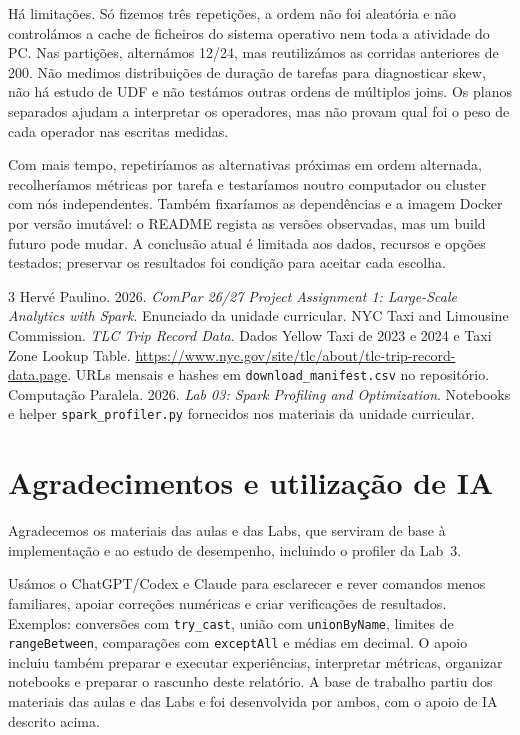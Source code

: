 \documentclass[sigconf]{acmart}
\begin{document}
Há limitações. Só fizemos três repetições, a ordem não foi
aleatória e não controlámos a cache de ficheiros do sistema
operativo nem toda a atividade do PC. Nas partições, alternámos
12/24, mas reutilizámos as corridas anteriores de 200. Não medimos
distribuições de duração de tarefas para diagnosticar skew, não
há estudo de UDF e não testámos outras ordens de múltiplos joins.
Os planos separados ajudam a interpretar os operadores, mas não
provam qual foi o peso de cada operador nas escritas medidas.

Com mais tempo, repetiríamos as alternativas próximas em ordem
alternada, recolheríamos métricas por tarefa e testaríamos noutro
computador ou cluster com nós independentes. Também fixaríamos as
dependências e a imagem Docker por versão imutável: o README
regista as versões observadas, mas um build futuro pode mudar.
A conclusão atual é limitada aos dados, recursos e opções testados;
preservar os resultados foi condição para aceitar cada escolha.

\clearpage
\begin{thebibliography}{3}
Hervé Paulino. 2026. \textit{ComPar 26/27 Project Assignment 1:
Large-Scale Analytics with Spark}. Enunciado da unidade curricular.
NYC Taxi and Limousine Commission. \textit{TLC Trip Record Data}.
Dados Yellow Taxi de 2023 e 2024 e Taxi Zone Lookup Table.
\url{https://www.nyc.gov/site/tlc/about/tlc-trip-record-data.page}.
URLs mensais e hashes em \texttt{download\_manifest.csv} no repositório.
Computação Paralela. 2026. \textit{Lab 03: Spark Profiling and
Optimization}. Notebooks e helper \texttt{spark\_profiler.py}
fornecidos nos materiais da unidade curricular.
\end{thebibliography}

\section*{Agradecimentos e utilização de IA}
Agradecemos os materiais das aulas e das Labs, que serviram de base
à implementação e ao estudo de desempenho, incluindo o profiler da Lab~3.

Usámos o ChatGPT/Codex e Claude para esclarecer e rever comandos menos
familiares, apoiar correções numéricas e criar verificações de
resultados. Exemplos: conversões com \texttt{try\_cast}, união com
\texttt{unionByName}, limites de \texttt{rangeBetween}, comparações
com \texttt{exceptAll} e médias em decimal. O apoio incluiu também
preparar e executar experiências, interpretar métricas, organizar
notebooks e preparar o rascunho deste relatório. A base de trabalho partiu dos materiais das aulas e das Labs e foi
desenvolvida por ambos, com o apoio de IA descrito acima.
\end{document}

